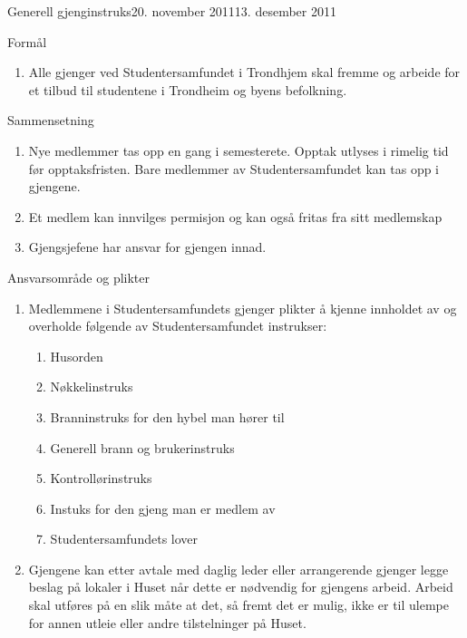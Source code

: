 \begin{instruks}{Generell gjenginstruks}{20. november 2011}{13. desember 2011}
    
    \begin{instruksledd}{Formål}
        \begin{enumerate}
            \item Alle gjenger ved Studentersamfundet i Trondhjem skal fremme og arbeide for et
                  tilbud til studentene i Trondheim og byens befolkning.
        \end{enumerate}
    \end{instruksledd}


    \begin{instruksledd}{Sammensetning}
        \begin{enumerate}
            \item Nye medlemmer tas opp en gang i semesterete. Opptak utlyses i rimelig
                tid før opptaksfristen. Bare medlemmer av Studentersamfundet kan tas opp i
                gjengene.
            \item Et medlem kan innvilges permisjon og kan også fritas fra sitt medlemskap
            \item Gjengsjefene har ansvar for gjengen innad.
        \end{enumerate}

    \end{instruksledd}


    \begin{instruksledd}{Ansvarsområde og plikter}
        \begin{enumerate}
            \item Medlemmene i Studentersamfundets gjenger plikter å kjenne innholdet av
                og overholde følgende av Studentersamfundet instrukser:
                \begin{enumerate}
                    \item Husorden
                    \item Nøkkelinstruks
                    \item Branninstruks for den hybel man hører til
                    \item Generell brann og brukerinstruks
                    \item Kontrollørinstruks
                    \item Instuks for den gjeng man er medlem av
                    \item Studentersamfundets lover
                \end{enumerate}
            \item Gjengene kan etter avtale med daglig leder eller arrangerende gjenger
                legge beslag på lokaler i Huset når dette er nødvendig for gjengens
                arbeid. Arbeid skal utføres på en slik måte at det, så fremt det er mulig,
                ikke er til ulempe for annen utleie eller andre tilstelninger på Huset.
        \end{enumerate}


\end{instruksledd}
\end{instruks}
